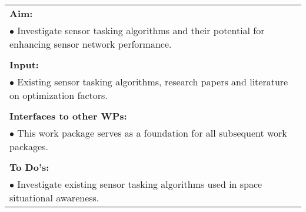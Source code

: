 \begin{table}[!h]
\begin{center}
\begin{tabular}{|p{35mm}||p{55mm}|p{50mm}||p{40mm}|}
      \hline\hline
      \multicolumn{4}{|p{150mm}|}{\textbf{Aim:}}                                                                                                                                                            \\
      \multicolumn{4}{|p{150mm}|}{$\bullet$ Investigate sensor tasking algorithms and their potential for enhancing sensor network performance.}                                                   \\
      \multicolumn{4}{|p{150mm}|}{}                                                                                                                                                                           \\
      \multicolumn{4}{|p{150mm}|}{\textbf{Input:}}                                                                                                                                                            \\
      \multicolumn{4}{|p{150mm}|}{$\bullet$ Existing sensor tasking algorithms, research papers and literature on optimization factors.}                                                                                                                                 \\
      \multicolumn{4}{|p{150mm}|}{}                                                                                                                                                                           \\
      \multicolumn{4}{|p{150mm}|}{\textbf{Interfaces to other WPs:}}                                                                                                                                    \\
      \multicolumn{4}{|p{150mm}|}{$\bullet$ This work package serves as a foundation for all subsequent work packages.}                                                                                              \\
      \multicolumn{4}{|p{150mm}|}{}                                                                                                                                                                           \\
      \multicolumn{4}{|p{150mm}|}{\textbf{To Do's:}}                                                                                                                                                         \\
      \multicolumn{4}{|p{150mm}|}{$\bullet$ Investigate existing sensor tasking algorithms used in space situational awareness.}\\

\end{tabular}
\end{center}
\end{table}
